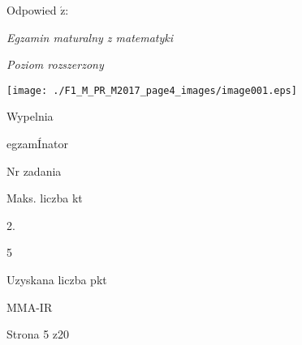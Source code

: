 \documentclass[a4paper,12pt]{article}
\begin{document}
Odpowied $\acute{\mathrm{z}}$:

{\it Egzamin maturalny z matematyki}

{\it Poziom rozszerzony}
\begin{center}
\texttt{[image: ./F1\_M\_PR\_M2017\_page4\_images/image001.eps]}
\end{center}
Wypelnia

egzamÍnator

Nr zadania

Maks. liczba kt

2.

5

Uzyskana liczba pkt

MMA-IR

Strona 5 z20
\end{document}

